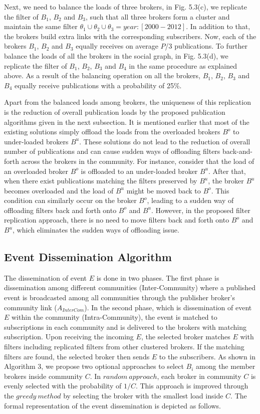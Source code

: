 Next, we need to balance the loads of three brokers, in Fig. 5.3(c), we replicate the filter of $B_1$, $B_2$ and $B_3$, such that all three brokers form a cluster and maintain the same filter $\theta_1 \cup \theta_2 \cup \theta_3 = {year: [2000-2012]}$. In addition to that, the brokers build extra links with the corresponding subscribers. Now, each of the brokers $B_1$, $B_2$ and $B_3$ equally receives on average $P$/3 publications. To further balance the loads of all the brokers in the social graph, in Fig. 5.3(d), we replicate the filter of $B_1$, $B_2$, $B_3$ and $B_4$ in the same procedure as explained above. As a result of the balancing operation on all the brokers, $B_1$, $B_2$, $B_3$ and $B_4$ equally receive publications with a probability of 25\%.

Apart from the balanced loads among brokers, the uniqueness of this replication is the reduction of overall publication loads by the proposed publication algorithms given in the next subsection. It is mentioned earlier that most of the existing solutions simply offload the loads from the overloaded brokers $B^o$ to under-loaded brokers $B^u$. These solutions do not lead to the reduction of overall number of publications and can cause sudden ways of offloading filters back-and-forth across the brokers in the community. For instance, consider that the load of an overloaded broker $B^o$ is offloaded to an under-loaded broker $B^u$. After that, when there exist publications matching the filters preserved by $B^u$, the broker $B^u$ becomes overloaded and the load of $B^u$ might be moved back to $B^o$. This condition can similarly occur on the broker $B^o$, leading to a sudden way of offloading filters back and forth onto $B^o$ and $B^u$. However, in the proposed filter replication approach, there is no need to move filters back and forth onto $B^o$ and $B^u$, which eliminates the sudden ways of offloading issue.

\subsection{Event Dissemination Algorithm}\label{Chap5_03_03}
The dissemination of event $E$ is done in two phases. The first phase is dissemination among different communities (Inter-Community) where a published event is broadcasted among all communities through the publisher broker's community link ($A_{InterCom}$). In the second phase, which is dissemination of event $E$ within the community (Intra-Community), the event is matched to subscriptions in each community and is delivered to the brokers with matching subscription. Upon receiving the incoming $E$, the selected broker matches $E$ with filters including replicated filters from other clustered brokers. If the matching filters are found, the selected broker then sends $E$ to the subscribers. As shown in Algorithm 3, we propose two optional approaches to select $B_i$ among the member brokers inside community $C$. In $random~approach$, each broker in community $C$ is evenly selected with the probability of $1/C$. This approach is improved through the $greedy~method$ by selecting the broker with the smallest load inside $C$. The formal representation of the event dissemination is depicted as follows.

